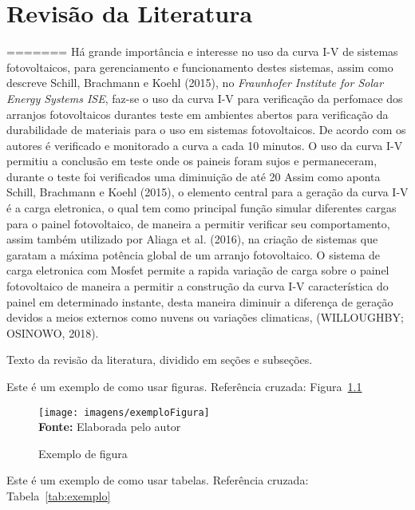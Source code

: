 \chapter{Revisão da Literatura}
\label{cap:02}

=======
Há grande importância e interesse no uso da curva I-V de sistemas fotovoltaicos, para gerenciamento e funcionamento destes sistemas, assim como descreve Schill, Brachmann e Koehl (2015), no \textit{Fraunhofer Institute for Solar Energy Systems ISE}, faz-se o uso da curva I-V para verificação da perfomace dos arranjos fotovoltaicos durantes teste em ambientes abertos para verificação da durabilidade de materiais para o uso em sistemas fotovoltaicos. De acordo com os autores é verificado e monitorado a curva a cada 10 minutos. O uso da curva I-V permitiu a conclusão em teste onde os paineis foram sujos e permaneceram, durante o teste foi verificados uma diminuição de até 20%
Assim como aponta Schill, Brachmann e Koehl (2015), o elemento central para a geração da curva I-V é a carga eletronica, o qual tem como principal função simular diferentes cargas para o painel fotovoltaico, de maneira a permitir verificar seu comportamento, assim também utilizado por Aliaga et al. (2016), na criação de sistemas que garatam a máxima potência global de um arranjo fotovoltaico.
O sistema de carga eletronica com Mosfet permite a rapida variação de carga sobre o painel fotovoltaico de maneira a permitir a construção da curva I-V característica do painel em determinado instante, desta maneira diminuir a diferença de geração devidos a meios externos como nuvens ou variações climaticas, (WILLOUGHBY; OSINOWO, 2018).

Texto da revisão da literatura, dividido em seções e subseções.


Este é um exemplo de como usar figuras. Referência cruzada: Figura~\ref{fig:exemplo}

\FloatBarrier
\begin{figure}[!htbp]
	\centering
	\caption{Exemplo de figura}
	\texttt{[image: imagens/exemploFigura]}
	\\\textbf{Fonte:} Elaborada pelo autor
	\label{fig:exemplo}
\end{figure}
\FloatBarrier


Este é um exemplo de como usar tabelas. Referência cruzada: Tabela~\ref{tab:exemplo}

